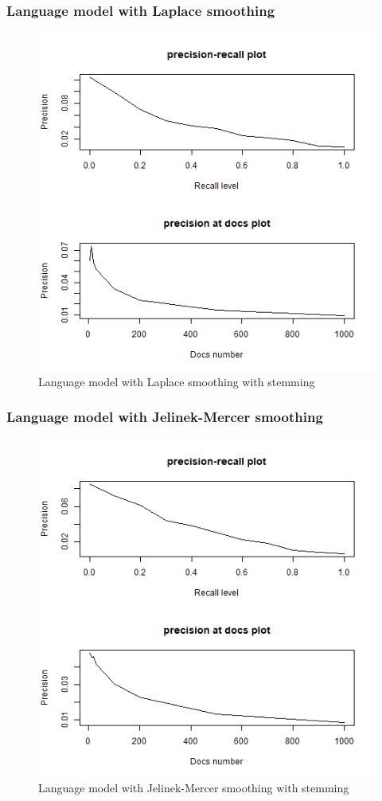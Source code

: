 \documentclass[a4pper,11pt,onecolumn]{article}
\begin{document}
\subsubsection{Language model with Laplace smoothing}
\begin{figure}[H]
\caption{Language model with Laplace smoothing with stemming}
\includegraphics[scale = 0.6]{model3.png}
\centering
\end{figure}

\subsubsection{Language model with Jelinek-Mercer smoothing}
\begin{figure}[H]
\caption{Language model with Jelinek-Mercer smoothing with stemming}
\includegraphics[scale = 0.6]{model5.png}
\centering
\end{figure}
\end{document}
